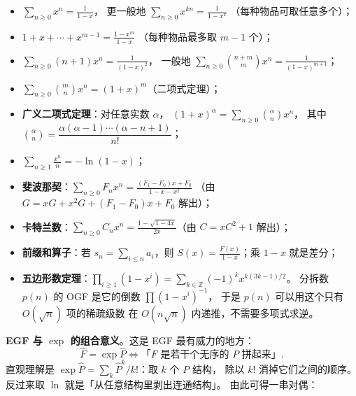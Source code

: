 		\begin{itemize}
			\item $\displaystyle \sum_{n\ge 0} x^n = \frac{1}{1-x}$，
			      更一般地 $\displaystyle \sum_{n\ge 0} x^{kn} = \frac{1}{1-x^k}$
			      （每种物品可取任意多个）；
			\item $\displaystyle 1 + x + \cdots + x^{m-1} = \frac{1-x^m}{1-x}$
			      （每种物品最多取 $m-1$ 个）；
			\item $\displaystyle \sum_{n\ge 0}(n+1)x^n = \frac{1}{(1-x)^2}$，
			      一般地 $\displaystyle \sum_{n \ge 0}\binom{n+m}{m}x^n = \frac{1}{(1-x)^{m+1}}$；
			\item $\displaystyle \sum_{n\ge 0}\binom{m}{n}x^n = (1+x)^m$（二项式定理）；
			\item \textbf{广义二项式定理}：对任意实数 $\alpha$，
			      $\displaystyle (1+x)^{\alpha} = \sum_{n \ge 0}\binom{\alpha}{n}x^n$，
			      其中 $\binom{\alpha}{n} = \dfrac{\alpha(\alpha-1)\cdots(\alpha-n+1)}{n!}$；
			\item $\displaystyle \sum_{n \ge 1}\frac{x^n}{n} = -\ln(1-x)$；
			\item \textbf{斐波那契}：$\displaystyle \sum_{n\ge0}F_n x^n
			      = \frac{(F_1-F_0)x + F_0}{1-x-x^2}$
			      （由 $G = xG + x^2G + (F_1-F_0)x + F_0$ 解出）；
			\item \textbf{卡特兰数}：$\displaystyle \sum_{n\ge0}C_n x^n
			      = \frac{1-\sqrt{1-4x}}{2x}$（由 $C = xC^2 + 1$ 解出）；
			\item \textbf{前缀和算子}：若 $s_n = \sum_{i\le n} a_i$，则
			      $\displaystyle S(x) = \frac{F(x)}{1-x}$；乘 $1-x$ 就是差分；
			\item \textbf{五边形数定理}：$\displaystyle \prod_{i\ge1}(1-x^i)
			      = \sum_{k\in\mathbb{Z}}(-1)^k x^{k(3k-1)/2}$。
			      分拆数 $p(n)$ 的 OGF 是它的倒数 $\prod (1-x^i)^{-1}$，
			      于是 $p(n)$ 可以用这个只有 $O(\sqrt n)$ 项的稀疏级数
			      在 $O(n\sqrt n)$ 内递推，不需要多项式求逆。
		\end{itemize}

		\textbf{EGF 与 $\exp$ 的组合意义}。这是 EGF 最有威力的地方：
		$$\hat F = \exp \hat P \iff
		  \text{「}F\text{ 是若干个无序的 }P\text{ 拼起来」}.$$
		直观理解是 $\exp \hat P = \sum_k \hat P^k / k!$：取 $k$ 个 $P$ 结构，
		除以 $k!$ 消掉它们之间的顺序。反过来取 $\ln$ 就是「从任意结构里剥出连通结构」。
		由此可得一串对偶：

